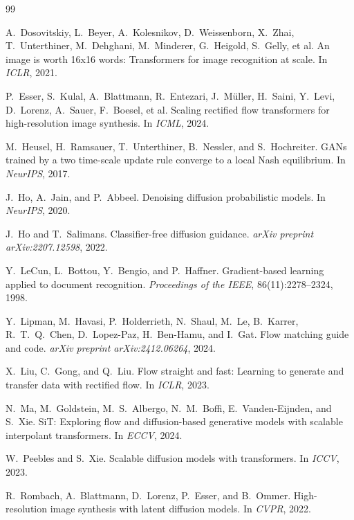\documentclass[11pt]{article}
\begin{document}
\small
\begin{thebibliography}{99}
\setlength{\itemsep}{0pt}

 A.~Dosovitskiy, L.~Beyer, A.~Kolesnikov, D.~Weissenborn, X.~Zhai, T.~Unterthiner, M.~Dehghani, M.~Minderer, G.~Heigold, S.~Gelly, et al. An image is worth 16x16 words: Transformers for image recognition at scale. In \emph{ICLR}, 2021.

 P.~Esser, S.~Kulal, A.~Blattmann, R.~Entezari, J.~M\"uller, H.~Saini, Y.~Levi, D.~Lorenz, A.~Sauer, F.~Boesel, et al. Scaling rectified flow transformers for high-resolution image synthesis. In \emph{ICML}, 2024.

 M.~Heusel, H.~Ramsauer, T.~Unterthiner, B.~Nessler, and S.~Hochreiter. GANs trained by a two time-scale update rule converge to a local Nash equilibrium. In \emph{NeurIPS}, 2017.

 J.~Ho, A.~Jain, and P.~Abbeel. Denoising diffusion probabilistic models. In \emph{NeurIPS}, 2020.

 J.~Ho and T.~Salimans. Classifier-free diffusion guidance. \emph{arXiv preprint arXiv:2207.12598}, 2022.

 Y.~LeCun, L.~Bottou, Y.~Bengio, and P.~Haffner. Gradient-based learning applied to document recognition. \emph{Proceedings of the IEEE}, 86(11):2278--2324, 1998.

 Y.~Lipman, M.~Havasi, P.~Holderrieth, N.~Shaul, M.~Le, B.~Karrer, R.~T.~Q.~Chen, D.~Lopez-Paz, H.~Ben-Hamu, and I.~Gat. Flow matching guide and code. \emph{arXiv preprint arXiv:2412.06264}, 2024.

 X.~Liu, C.~Gong, and Q.~Liu. Flow straight and fast: Learning to generate and transfer data with rectified flow. In \emph{ICLR}, 2023.

 N.~Ma, M.~Goldstein, M.~S.~Albergo, N.~M.~Boffi, E.~Vanden-Eijnden, and S.~Xie. SiT: Exploring flow and diffusion-based generative models with scalable interpolant transformers. In \emph{ECCV}, 2024.

 W.~Peebles and S.~Xie. Scalable diffusion models with transformers. In \emph{ICCV}, 2023.

 R.~Rombach, A.~Blattmann, D.~Lorenz, P.~Esser, and B.~Ommer. High-resolution image synthesis with latent diffusion models. In \emph{CVPR}, 2022.


\end{thebibliography}
\end{document}
